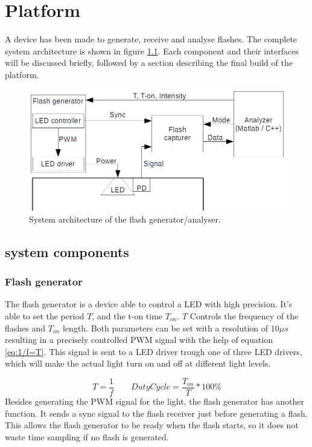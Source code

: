 \chapter{Platform}
\label{chp:Platform}
A device has been made to generate, receive and analyse flashes. The complete system architecture is shown in figure \ref{fig:systemOveriew}. Each component and their interfaces will be discussed briefly, followed by a section describing the final build of the platform.

\begin{figure}[h]
	\includegraphics[width=\textwidth]{pics/systemOverview.png}
	\caption{System architecture of the flash generator/analyser.\label{fig:systemOveriew}}
	
\end{figure}

\section{system components}

\subsection{Flash generator}
The flash generator is a device able to control a LED with high precision. It's able to set the period $T$, and the t-on time $T_{on}$. $T$ Controls the frequency of the flashes and $T_{on}$ length. Both parameters can be set with a resolution of $10\mu s$ resulting in a precisely controlled PWM signal with the help of equation \ref{eq:1/f=T}. This signal is sent to a LED driver trough one of three LED drivers, which will make the actual light turn on and off at different light levels.

\begin{equation}
\label{eq:1/f=T}
T=\frac{1}{f}
\qquad
DutyCycle=\frac{T_{on}}{T} * 100\%
\end{equation}
Besides generating the PWM signal for the light, the flash generator has another function. It sends a sync signal to the flash receiver just before generating a flash. This allows the flash generator to be ready when the flash starts, so it does not waste time sampling if no flash is generated.

